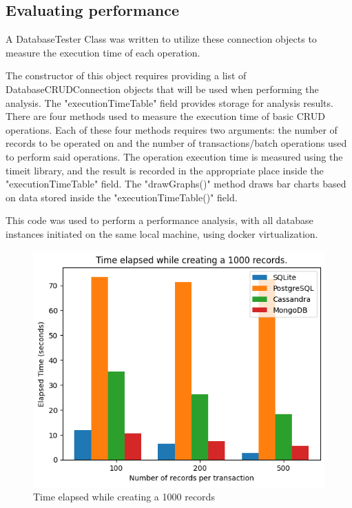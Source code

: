 \subsection{Evaluating performance}
\par A DatabaseTester Class was written to utilize these connection objects to measure the execution time of each operation. 

\par The constructor of this object requires providing a list of DatabaseCRUDConnection objects that will be used when performing the analysis. The "executionTimeTable" field provides storage for analysis results. There are four methods used to measure the execution time of basic CRUD operations. Each of these four methods requires two arguments: the number of records to be operated on and the number of transactions/batch operations used to perform said operations. The operation execution time is measured using the timeit library, and the result is recorded in the appropriate place inside the "executionTimeTable" field. The "drawGraphs()" method draws bar charts based on data stored inside the "executionTimeTable()" field.
\par This code was used to perform a performance analysis, with all database instances initiated on the same local machine, using docker virtualization. 
\begin{figure}[htbp]
 \centering
 \includegraphics[width=1\textwidth]{gfx/create}
 \caption{Time elapsed while creating a 1000 records}
\end{figure}
